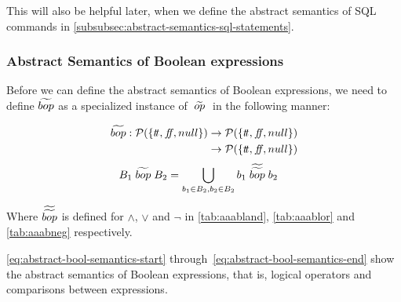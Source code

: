 This will also be helpful later, when we define the abstract semantics of SQL commands in \autoref{subsubsec:abstract-semantics-sql-statements}.

\subsubsection{Abstract Semantics of Boolean expressions}
Before we can define the abstract semantics of Boolean expressions, we need to define $\widetilde{bop}$ as a specialized instance of $\;\widetilde{op}\;$ in the following manner:


\begin{align}
    \begin{split}
        \aab{bop} : \mathcal{P}(\{\true, \false, null\}) &\rightarrow \mathcal{P}(\{\true, \false, null\}) \\
        &\rightarrow \mathcal{P}(\{\true, \false, null\})
    \end{split}
\end{align}
\begin{align}
    B_1 \;\widetilde{bop}\; B_2 &= \bigcup_{b_1 \in B_2, b_2 \in B_2} b_1 \;\widetilde{\widetilde{bop}}\; b_2
\end{align}

Where $\widetilde{\widetilde{bop}}$ is defined for $\land$, $\lor$ and $\neg$ in \autoref{tab:aaabland}, \autoref{tab:aaablor} and \autoref{tab:aaabneg} respectively.

\autoref{eq:abstract-bool-semantics-start} through~\ref{eq:abstract-bool-semantics-end} show the abstract semantics of Boolean expressions, that is, logical operators and comparisons between expressions.


